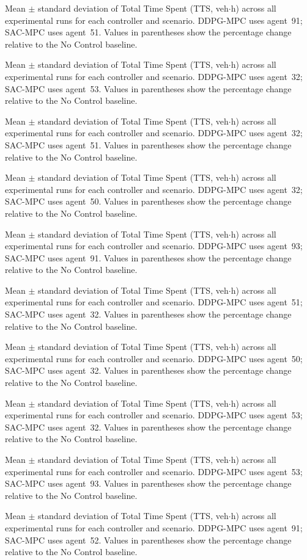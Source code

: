 \begin{table}[htbp]
\centering
\caption{Mean $\pm$ standard deviation of Total Time Spent (TTS, veh$\cdot$h) across all experimental runs for each controller and scenario. DDPG-MPC uses agent~91; SAC-MPC uses agent~51. Values in parentheses show the percentage change relative to the No Control baseline.}
\caption{Mean $\pm$ standard deviation of Total Time Spent (TTS, veh$\cdot$h) across all experimental runs for each controller and scenario. DDPG-MPC uses agent~32; SAC-MPC uses agent~53. Values in parentheses show the percentage change relative to the No Control baseline.}
\caption{Mean $\pm$ standard deviation of Total Time Spent (TTS, veh$\cdot$h) across all experimental runs for each controller and scenario. DDPG-MPC uses agent~32; SAC-MPC uses agent~51. Values in parentheses show the percentage change relative to the No Control baseline.}
\caption{Mean $\pm$ standard deviation of Total Time Spent (TTS, veh$\cdot$h) across all experimental runs for each controller and scenario. DDPG-MPC uses agent~32; SAC-MPC uses agent~50. Values in parentheses show the percentage change relative to the No Control baseline.}
\caption{Mean $\pm$ standard deviation of Total Time Spent (TTS, veh$\cdot$h) across all experimental runs for each controller and scenario. DDPG-MPC uses agent~93; SAC-MPC uses agent~91. Values in parentheses show the percentage change relative to the No Control baseline.}
\caption{Mean $\pm$ standard deviation of Total Time Spent (TTS, veh$\cdot$h) across all experimental runs for each controller and scenario. DDPG-MPC uses agent~51; SAC-MPC uses agent~32. Values in parentheses show the percentage change relative to the No Control baseline.}
\caption{Mean $\pm$ standard deviation of Total Time Spent (TTS, veh$\cdot$h) across all experimental runs for each controller and scenario. DDPG-MPC uses agent~50; SAC-MPC uses agent~32. Values in parentheses show the percentage change relative to the No Control baseline.}
\caption{Mean $\pm$ standard deviation of Total Time Spent (TTS, veh$\cdot$h) across all experimental runs for each controller and scenario. DDPG-MPC uses agent~53; SAC-MPC uses agent~32. Values in parentheses show the percentage change relative to the No Control baseline.}
\caption{Mean $\pm$ standard deviation of Total Time Spent (TTS, veh$\cdot$h) across all experimental runs for each controller and scenario. DDPG-MPC uses agent~53; SAC-MPC uses agent~93. Values in parentheses show the percentage change relative to the No Control baseline.}
\caption{Mean $\pm$ standard deviation of Total Time Spent (TTS, veh$\cdot$h) across all experimental runs for each controller and scenario. DDPG-MPC uses agent~91; SAC-MPC uses agent~52. Values in parentheses show the percentage change relative to the No Control baseline.}

\end{table}
